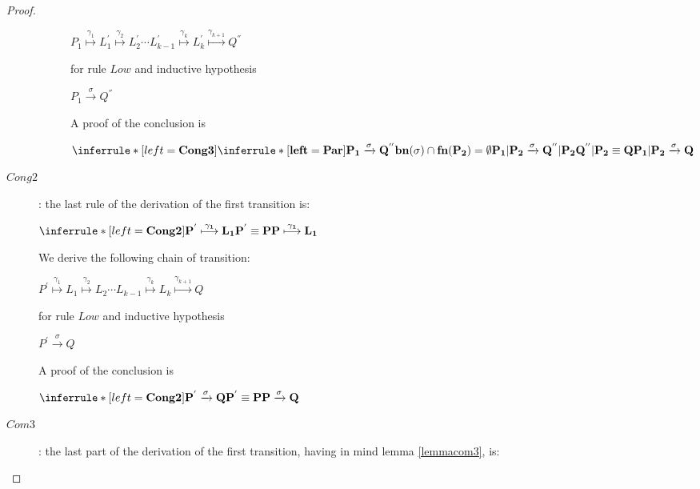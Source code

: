 \begin{proposition}
\begin{proof}
\begin{description}
\begin{description}
		    \begin{center}
		      $P_{1} \stackrel{\gamma_{1}}{\longmapsto} L_{1}^{'} \stackrel{\gamma_{2}}{\longmapsto} L_{2}^{'} \cdots L_{k-1}^{'} \stackrel{\gamma_{k}}{\longmapsto} L_{k}^{'}\stackrel{\gamma_{k+1}}{\longmapsto} Q^{''}$ 
		    \end{center}
		    for rule $Low$ and inductive hypothesis
		    \begin{center}
		      $P_{1} \xrightarrow{\sigma} Q^{''}$ 
		    \end{center}
		    A proof of the conclusion is
		    \begin{center}
		      $\inferrule*[left=\bf{Cong3}]{
			  \inferrule* [left=\bf{Par}]{
			      P_{1} \xrightarrow{\sigma} Q^{''}
			    \\
			      bn(\sigma)\cap fn(P_{2})=\emptyset
			  }{
			    P_{1}|P_{2} \xrightarrow{\sigma} Q^{''}|P_{2}
			  }
			\\
			  Q^{''}|P_{2} \equiv Q
		      }{
			P_{1}|P_{2} \xrightarrow{\sigma} Q
		      }$ 
		    \end{center}
		\end{description}
	      \item[$Cong2$]: 
		the last rule of the derivation of the first transition is:
		\begin{center}
		  $\inferrule* [left=\bf{Cong2}]{
		      P^{'} \stackrel{\gamma_{1}}{\longmapsto} L_{1}
		    \\
		      P^{'} \equiv P
		  }{
		    P \stackrel{\gamma_{1}}{\longmapsto} L_{1}
		  }$ 		      
		\end{center}
		We derive the following chain of transition:
		\begin{center}
		  $P^{'} \stackrel{\gamma_{1}}{\longmapsto} L_{1} \stackrel{\gamma_{2}}{\longmapsto} L_{2} \cdots L_{k-1} \stackrel{\gamma_{k}}{\longmapsto} L_{k}\stackrel{\gamma_{k+1}}{\longmapsto} Q$
		\end{center}
		for rule $Low$ and inductive hypothesis
		\begin{center}
		  $P^{'} \xrightarrow{\sigma} Q$ 
		\end{center}
		A proof of the conclusion is
		\begin{center}
		  $\inferrule* [left=\bf{Cong2}]{
			P^{'} \xrightarrow{\sigma} Q
		    \\
		      P^{'} \equiv P
		  }{
		    P \xrightarrow{\sigma} Q
		  }$ 
		\end{center}
	      \item[$Com3$]: 
		the last part of the derivation of the first transition, having in mind lemma \ref{lemmacom3}, is:

\end{description}
\end{proof}
\end{proposition}
